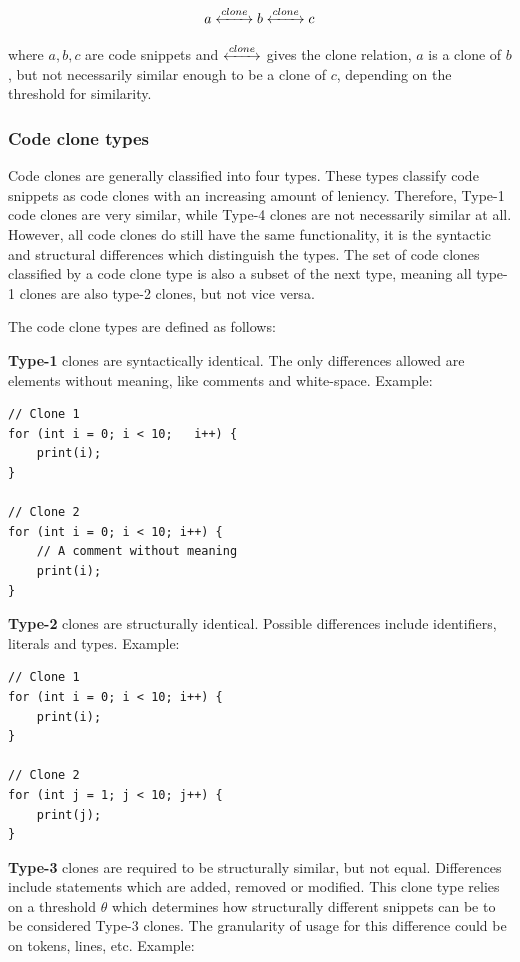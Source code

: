 \documentclass[12pt]{article}
\begin{document}
$$a \xleftrightarrow{clone} b \xleftrightarrow{clone} c$$


where $a,b,c$ are code snippets and $\xleftrightarrow{clone}$ gives the clone relation, $a$ is
a clone of $b$, but not necessarily similar enough to be a clone of $c$, depending on the
threshold for similarity.
\subsubsection{Code clone types}

Code clones are generally classified into four types\cite{Inoue_introduction_to_cc}. These
types classify code snippets as code clones with an increasing amount of leniency.
Therefore, Type-1 code clones are very similar, while Type-4 clones are not necessarily
similar at all. However, all code clones do still have the same functionality, it is the
syntactic and structural differences which distinguish the types. The set of code clones
classified by a code clone type is also a subset of the next type, meaning all type-1
clones are also type-2 clones, but not vice versa.

The code clone types are defined as follows:

\textbf{Type-1} clones are syntactically identical. The only differences allowed are elements
without meaning, like comments and white-space. Example:

\begin{lstlisting}
// Clone 1
for (int i = 0; i < 10;   i++) {
    print(i);
}

// Clone 2
for (int i = 0; i < 10; i++) {
    // A comment without meaning
    print(i);
}

\end{lstlisting}

\textbf{Type-2} clones are structurally identical. Possible differences include
identifiers, literals and types. Example:

\begin{lstlisting}
// Clone 1
for (int i = 0; i < 10; i++) {
    print(i);
}

// Clone 2
for (int j = 1; j < 10; j++) {
    print(j);
}
\end{lstlisting}

\textbf{Type-3} clones are required to be structurally similar, but not equal. Differences
include statements which are added, removed or modified. This clone type relies on a
threshold $\theta$ which determines how structurally different snippets can be to be
considered Type-3 clones\cite{Inoue_introduction_to_cc}. The granularity of usage for this
difference could be on tokens, lines, etc. Example:
\end{document}
